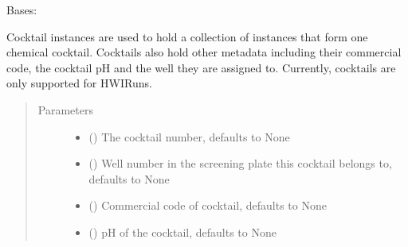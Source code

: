 \documentclass[letterpaper,10pt,english]{sphinxmanual}
\begin{document}
\begin{fulllineitems}
\label{\detokenize{polo.crystallography:polo.crystallography.cocktail.Cocktail}}
Bases: 

Cocktail instances are used to hold a collection of 
{\hyperref[\detokenize{polo.crystallography:polo.crystallography.cocktail.Reagent}]{}}
instances that form one chemical cocktail. 
Cocktails also hold other metadata including their commercial code,
the cocktail pH and the well they are assigned to.
Currently, cocktails are only supported for HWIRuns.
\begin{quote}\begin{description}
\item[{Parameters}] \leavevmode\begin{itemize}
\item {} 
 (\sphinxstyleliteralemphasis{\sphinxupquote{, }}) \textendash{} The cocktail number, defaults to None

\item {} 
 (\sphinxstyleliteralemphasis{\sphinxupquote{, }}) \textendash{} Well number in the screening plate this
cocktail belongs to, defaults to None

\item {} 
 (\sphinxstyleliteralemphasis{\sphinxupquote{, }}) \textendash{} Commercial code of cocktail, defaults to None

\item {} 
 (\sphinxstyleliteralemphasis{\sphinxupquote{, }}) \textendash{} pH of the cocktail, defaults to None


\end{itemize}
\end{description}
\end{quote}
\end{fulllineitems}
\end{document}
